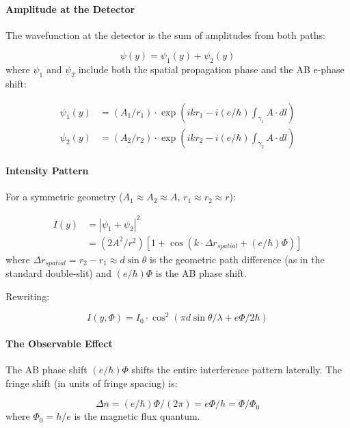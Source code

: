 \documentclass[aps,prd,preprint,superscriptaddress,longbibliography,floatfix]{revtex4-2}
\theoremstyle{remark}
\begin{document}
\paragraph{Amplitude at the Detector}

The wavefunction at the detector is the sum of amplitudes from both paths:


\begin{equation}
    \psi(y) = \psi_{1}(y) + \psi_{2}(y)
\end{equation}
where $\psi_{1}$ and $\psi_{2}$ include both the spatial propagation phase and the AB e-phase shift:


\begin{align}
    \psi_{1}(y) &= (A_{1}/r_{1}) \cdot \exp(ikr_{1} - i(e/\hbar)\int_{\gamma_{1}} A \cdot dl) \\
    \psi_{2}(y) &= (A_{2}/r_{2}) \cdot \exp(ikr_{2} - i(e/\hbar)\int_{\gamma_{2}} A \cdot dl)
\end{align}

\paragraph{Intensity Pattern}

For a symmetric geometry ($A_{1} \approx A_{2} \approx A$, $r_{1} \approx r_{2} \approx r$):


\begin{align}
    I(y) &= |\psi_{1} + \psi_{2}|^{2} \\
    & = (2A^{2}/r^{2})[1 + \cos(k\cdot\Delta r_{spatial} + (e/\hbar)\Phi)]
\end{align}
where $\Delta r_{spatial} = r_{2} - r_{1} \approx d \sin \theta$ is the geometric path difference (as in the standard double-slit) and $(e/\hbar)\Phi$ is the AB phase shift.

Rewriting:


\begin{equation}
    I(y, \Phi) = I_{0} \cdot \cos^2(\pi d \sin \theta/\lambda + e\Phi/2\hbar)
\end{equation}

\paragraph{The Observable Effect}

The AB phase shift $(e/\hbar)\Phi$ shifts the entire interference pattern laterally. The fringe shift (in units of fringe spacing) is:


\begin{equation}
    \Delta n = (e/\hbar)\Phi / (2\pi) = e\Phi/h = \Phi/\Phi_{0}
\end{equation}
where $\Phi_{0} = h/e$ is the magnetic flux quantum.
\end{document}
